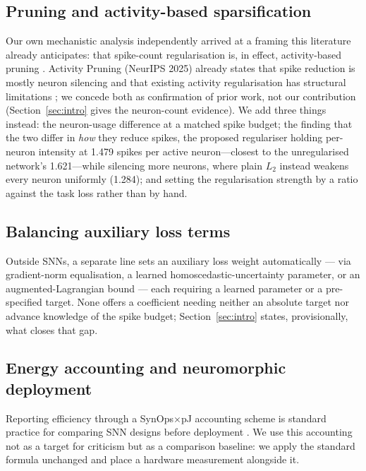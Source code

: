\subsection{Pruning and activity-based sparsification}
Our own mechanistic analysis independently arrived at a framing this
literature already anticipates: that spike-count regularisation is, in
effect, activity-based pruning
\cite{bu2025activity,li2024spiking,yao2023inherent}. Activity Pruning
(NeurIPS 2025) already states that spike reduction is mostly neuron silencing
and that existing activity regularisation has structural limitations
\cite{bu2025activity}; we concede both as confirmation of prior work, not our
contribution (Section~\ref{sec:intro} gives the neuron-count evidence). We
add three things instead: the neuron-usage difference at a matched spike budget; the
finding that the two differ in \emph{how} they reduce spikes, the proposed regulariser
holding per-neuron intensity at 1.479 spikes per active neuron---closest to the
unregularised network's 1.621---while silencing more neurons, where plain $L_2$ instead
weakens every neuron uniformly (1.284); and setting the regularisation strength by a
ratio against the task loss rather than by hand.

\subsection{Balancing auxiliary loss terms}
Outside SNNs, a separate line sets an auxiliary loss weight automatically
\cite{chen2018gradnorm,kendall2018multitask,franke2024improving} --- via
gradient-norm equalisation, a learned homoscedastic-uncertainty parameter, or
an augmented-Lagrangian bound --- each requiring a learned parameter or a
pre-specified target.
None offers a coefficient needing neither an absolute target nor advance
knowledge of the spike budget; Section~\ref{sec:intro} states, provisionally,
what closes that gap.

\subsection{Energy accounting and neuromorphic deployment}
Reporting efficiency through a SynOps$\times$pJ accounting scheme is standard
practice for comparing SNN designs before deployment
\cite{horowitz2014computing,lemaire2022analytical,yao2024spikebased}. We use
this accounting not as a target for criticism but as a comparison baseline:
we apply the standard formula unchanged and place a hardware measurement
alongside it.

